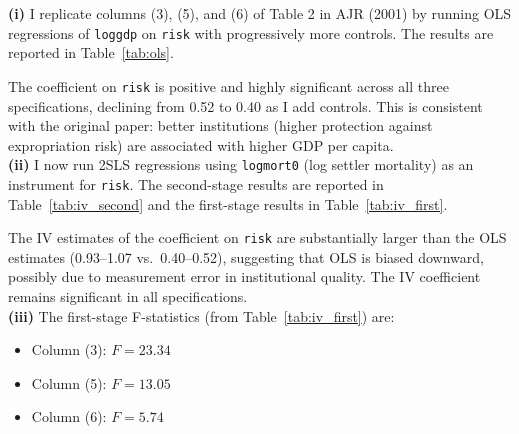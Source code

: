 

\textbf{(i)} I replicate columns (3), (5), and (6) of Table 2 in AJR (2001) by running OLS regressions of \texttt{loggdp} on \texttt{risk} with progressively more controls. The results are reported in Table~\ref{tab:ols}.

\begin{table}[H]
\centering
\caption{OLS Regressions -- Replication of AJR (2001) Table 2}
\label{tab:ols}

\end{table}

The coefficient on \texttt{risk} is positive and highly significant across all three specifications, declining from 0.52 to 0.40 as I add controls. This is consistent with the original paper: better institutions (higher protection against expropriation risk) are associated with higher GDP per capita.\\

\textbf{(ii)} I now run 2SLS regressions using \texttt{logmort0} (log settler mortality) as an instrument for \texttt{risk}. The second-stage results are reported in Table~\ref{tab:iv_second} and the first-stage results in Table~\ref{tab:iv_first}.

\begin{table}[H]
\centering
\caption{IV Regressions -- Second Stage}
\label{tab:iv_second}

\end{table}

\begin{table}[H]
\centering
\caption{IV Regressions -- First Stage}
\label{tab:iv_first}

\end{table}

The IV estimates of the coefficient on \texttt{risk} are substantially larger than the OLS estimates (0.93--1.07 vs.\ 0.40--0.52), suggesting that OLS is biased downward, possibly due to measurement error in institutional quality. The IV coefficient remains significant in all specifications.\\

\textbf{(iii)} The first-stage F-statistics (from Table~\ref{tab:iv_first}) are:
\begin{itemize}
    \item Column (3): $F = 23.34$
    \item Column (5): $F = 13.05$
    \item Column (6): $F = 5.74$
\end{itemize}

